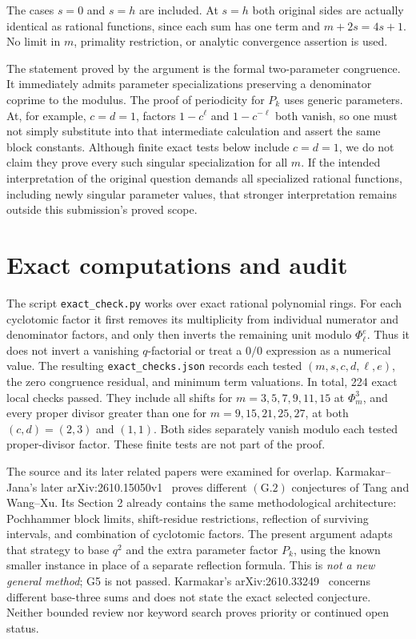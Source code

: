 \documentclass[11pt,a4paper]{article}
\begin{document}
The cases $s=0$ and $s=h$ are included. At $s=h$ both original sides
are actually identical as rational functions, since each sum has one
term and $m+2s=4s+1$. No limit in $m$, primality restriction, or analytic
convergence assertion is used.

The statement proved by the argument is the formal two-parameter
congruence. It immediately admits parameter specializations preserving
a denominator coprime to the modulus. The proof of periodicity for $P_k$
uses generic parameters. At, for example, $c=d=1$, factors
$1-c^\ell$ and $1-c^{-\ell}$ both vanish, so one must not simply substitute
into that intermediate calculation and assert the same block constants.
Although finite exact tests below include $c=d=1$, we do not claim they
prove every such singular specialization for all $m$. If the intended
interpretation of the original question demands all specialized rational
functions, including newly singular parameter values, that stronger
interpretation remains outside this submission's proved scope.

\section{Exact computations and audit}
The script \texttt{exact\_check.py} works over exact rational polynomial
rings. For each cyclotomic factor it first removes its multiplicity from
individual numerator and denominator factors, and only then inverts the
remaining unit modulo $\Phi_\ell^e$. Thus it does not invert a vanishing
$q$-factorial or treat a $0/0$ expression as a numerical value.
The resulting \texttt{exact\_checks.json} records each tested $(m,s,c,d,\ell,e)$,
the zero congruence residual, and minimum term valuations.
In total, 224 exact local checks passed. They include all shifts for
$m=3,5,7,9,11,15$ at $\Phi_m^3$, and every proper divisor greater than
one for $m=9,15,21,25,27$, at both $(c,d)=(2,3)$ and $(1,1)$. Both
sides separately vanish modulo each tested proper-divisor factor.
These finite tests are not part of the proof.

The source and its later related papers were examined for overlap.
Karmakar--Jana's later arXiv:2610.15050v1~\cite{KJlater} proves different
$(\mathrm{G}.2)$ conjectures of Tang and Wang--Xu. Its Section 2 already
contains the same methodological architecture: Pochhammer block limits,
shift-residue restrictions, reflection of surviving intervals, and
combination of cyclotomic factors. The present argument adapts that
strategy to base $q^2$ and the extra parameter factor $P_k$, using the
known smaller instance in place of a separate reflection formula.
This is \emph{not a new general method}; G5 is not passed.
Karmakar's arXiv:2610.33249~\cite{Klater} concerns different base-three
sums and does not state the exact selected conjecture. Neither bounded
review nor keyword search proves priority or continued open status.
\end{document}
